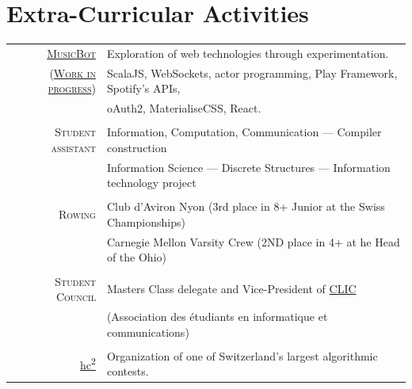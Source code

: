 \documentclass[a4paper,11pt]{article} %
\begin{document}

\section{Extra-Curricular Activities}
\begin{tabular}{rl}

\textsc{\large{\href{https://github.com/paullepoulpe/musicbot}{MusicBot}}} &
Exploration of web technologies through experimentation. \\

\textsc{\large{(\href{https://musicbot.ch}{Work in progress})}} &
ScalaJS, WebSockets, actor programming, Play Framework, Spotify's APIs, \\
& oAuth2, MaterialiseCSS, React.\\
\multicolumn{2}{c}{} \\

\textsc{\large{Student assistant}} &
Information, Computation, Communication ---
Compiler construction\\
& Information Science --- Discrete Structures ---
Information technology project \\
\multicolumn{2}{c}{} \\

\textsc{\large{Rowing}} &
Club d'Aviron Nyon (3rd place in 8+ Junior at the Swiss Championships)\\
& Carnegie Mellon Varsity Crew (2ND place in 4+ at he Head of the Ohio)\\
\multicolumn{2}{c}{} \\

\textsc{\large{Student Council}} &
Masters Class delegate and Vice-President of
\href{http://clic.epfl.ch/}{CLIC}\\
& (Association des étudiants en informatique et communications)\\
\multicolumn{2}{c}{} \\

\large{\href{http://hc2.ch/}{hc\textsuperscript{2}}} & Organization of one of
Switzerland's largest algorithmic contests.\\
\end{tabular}


\end{document}
